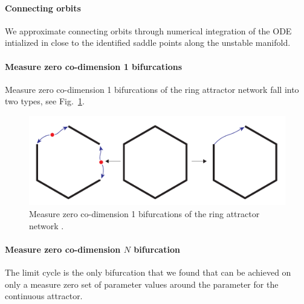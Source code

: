 \documentclass{article} %
\newcounter{ct}
\theoremstyle{definition}
\theoremstyle{remark}
\begin{document}
\paragraph{Connecting orbits}
We approximate connecting orbits through numerical integration of the ODE intialized in close to the identified saddle points along the unstable manifold.


\newpage
\paragraph{Measure zero co-dimension 1 bifurcations}
Measure zero co-dimension 1 bifurcations of the ring attractor network fall into two types, see Fig.~\ref{fig:meaure_zero_perturbations}.

\begin{figure}[tbhp]
     \centering
    \includegraphics[width=.9\textwidth]{ring_n6_perturbations_schematic}
       \caption{Measure zero co-dimension 1 bifurcations of the ring attractor network \citep{noorman2024accurate}.}\label{fig:meaure_zero_perturbations}
\end{figure}


\paragraph{Measure zero co-dimension \(N\) bifurcation}
The limit cycle is the only bifurcation that we found that can be achieved on only a measure zero set of parameter values around the parameter for the continuous attractor.
\end{document}
